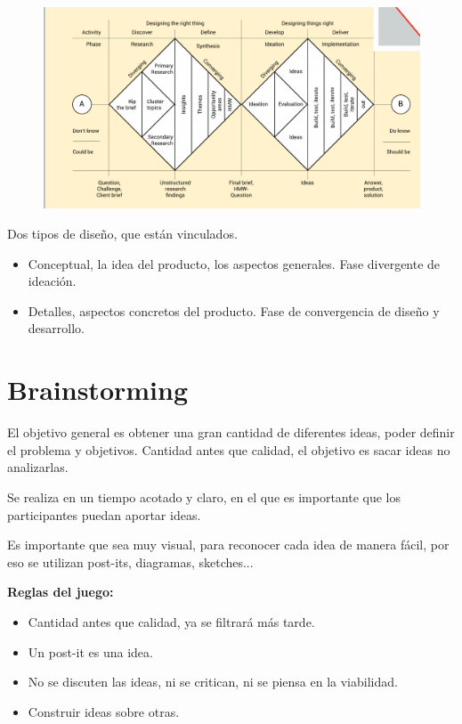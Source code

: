 \documentclass[12pt, twoside, openright]{report} %
\begin{document}
\begin{figure}[H]
	{\includegraphics[scale=.4]{2021-03-20 21_09_36-L5.pdf - Foxit Reader.png}}
\end{figure}

Dos tipos de diseño, que están vinculados.
\begin{itemize}
	\item Conceptual, la idea del producto, los aspectos generales. Fase divergente de ideación.
	\item Detalles, aspectos concretos del producto. Fase de convergencia de diseño y desarrollo.
\end{itemize}

\section{Brainstorming}
El objetivo general es obtener una gran cantidad de diferentes ideas, poder definir el problema y objetivos. Cantidad antes que calidad, el objetivo es sacar ideas no analizarlas.

Se realiza en un tiempo acotado y claro, en el que es importante que los participantes puedan aportar ideas.

Es importante que sea muy visual, para reconocer cada idea de manera fácil, por eso se utilizan post-its, diagramas, sketches...

\textbf{Reglas del juego:}
\begin{itemize}
	\item Cantidad antes que calidad, ya se filtrará más tarde.
	\item Un post-it es una idea.
	\item No se discuten las ideas, ni se critican, ni se piensa en la viabilidad.
	\item Construir ideas sobre otras.
\end{itemize}
\end{document}
